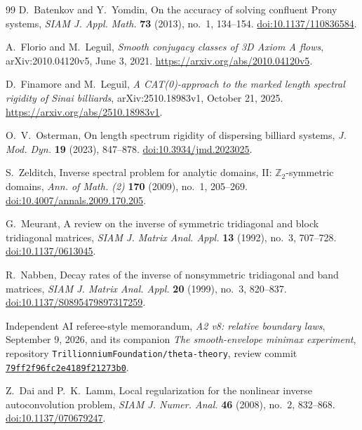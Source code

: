 \begin{thebibliography}{99}
D.~Batenkov and Y.~Yomdin, On the accuracy of solving confluent Prony
systems, \emph{SIAM J. Appl. Math.} \textbf{73} (2013), no.~1,
134--154. \href{https://doi.org/10.1137/110836584}{doi:10.1137/110836584}.

A.~Florio and M.~Leguil, \emph{Smooth conjugacy classes of 3D Axiom A
flows}, arXiv:2010.04120v5, June 3, 2021.
\url{https://arxiv.org/abs/2010.04120v5}.

D.~Finamore and M.~Leguil, \emph{A CAT(0)-approach to the marked
length spectral rigidity of Sinai billiards}, arXiv:2510.18983v1,
October 21, 2025. \url{https://arxiv.org/abs/2510.18983v1}.

O.~V.~Osterman, On length spectrum rigidity of dispersing billiard
systems, \emph{J. Mod. Dyn.} \textbf{19} (2023), 847--878.
\href{https://doi.org/10.3934/jmd.2023025}{doi:10.3934/jmd.2023025}.

S.~Zelditch, Inverse spectral problem for analytic domains, II:
$\mathbb Z_2$-symmetric domains, \emph{Ann. of Math. (2)}
\textbf{170} (2009), no.~1, 205--269.
\href{https://doi.org/10.4007/annals.2009.170.205}{doi:10.4007/annals.2009.170.205}.

G.~Meurant, A review on the inverse of symmetric tridiagonal and
block tridiagonal matrices, \emph{SIAM J. Matrix Anal. Appl.}
\textbf{13} (1992), no.~3, 707--728.
\href{https://doi.org/10.1137/0613045}{doi:10.1137/0613045}.

R.~Nabben, Decay rates of the inverse of nonsymmetric tridiagonal and
band matrices, \emph{SIAM J. Matrix Anal. Appl.} \textbf{20} (1999),
no.~3, 820--837.
\href{https://doi.org/10.1137/S0895479897317259}{doi:10.1137/S0895479897317259}.

Independent AI referee-style memorandum, \emph{A2 v8: relative
boundary laws}, September 9, 2026, and its companion
\emph{The smooth-envelope minimax experiment}, repository
\texttt{Trillionnium\allowbreak Foundation/\allowbreak theta-theory}, review commit
\href{https://github.com/TrillionniumFoundation/theta-theory/commit/79ff2f96fc2e41899666065355238915f21273b0}{\texttt{79ff2f96\allowbreak fc2e4189\allowbreak f21273b0}}.

Z.~Dai and P.~K.~Lamm, Local regularization for the nonlinear inverse
autoconvolution problem, \emph{SIAM J. Numer. Anal.} \textbf{46}
(2008), no.~2, 832--868.
\href{https://doi.org/10.1137/070679247}{doi:10.1137/070679247}.


\end{thebibliography}
